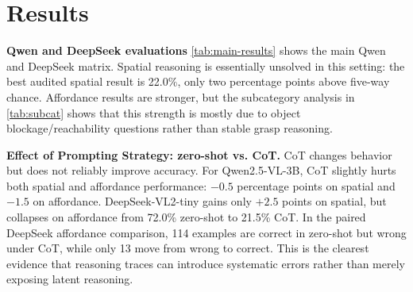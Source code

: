 \section{Results}
\label{sec:results}

\textbf{Qwen and DeepSeek evaluations}
\cref{tab:main-results} shows the main Qwen and DeepSeek matrix. Spatial reasoning is essentially unsolved in this setting: the best audited spatial result is 22.0\%, only two percentage points above five-way chance. Affordance results are stronger, but the subcategory analysis in \cref{tab:subcat} shows that this strength is mostly due to object blockage/reachability questions rather than stable grasp reasoning.

\begin{table}[htbp]
  \centering
  \caption{Main audited 200-example results. Cells report correct/total, accuracy, and average response time. Bold values mark the near-chance spatial results and the DeepSeek affordance zero-shot/CoT contrast.}
  \label{tab:main-results}
\end{table}

\textbf{Effect of Prompting Strategy: zero-shot vs. CoT.}
CoT changes behavior but does not reliably improve accuracy. For Qwen2.5-VL-3B, CoT slightly hurts both spatial and affordance performance: $-0.5$ percentage points on spatial and $-1.5$ on affordance. DeepSeek-VL2-tiny gains only $+2.5$ points on spatial, but collapses on affordance from 72.0\% zero-shot to 21.5\% CoT. In the paired DeepSeek affordance comparison, 114 examples are correct in zero-shot but wrong under CoT, while only 13 move from wrong to correct. This is the clearest evidence that reasoning traces can introduce systematic errors rather than merely exposing latent reasoning.

